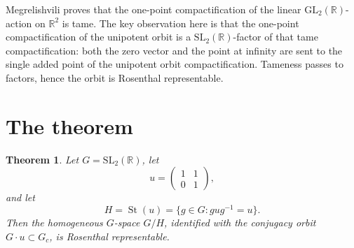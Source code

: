 \documentclass[11pt]{article}
\newtheorem{theorem}{Theorem}
\newcommand{\R}{\mathbb{R}}
\newcommand{\SL}{\mathrm{SL}}
\newcommand{\GL}{\mathrm{GL}}
\newcommand{\St}{\operatorname{St}}
\begin{document}
Megrelishvili proves that the one-point compactification of the linear
\(\GL_2(\R)\)-action on \(\R^2\) is tame.  The key observation here is
that the one-point compactification of the unipotent orbit is a
\(\SL_2(\R)\)-factor of that tame compactification: both the zero vector
and the point at infinity are sent to the single added point of the
unipotent orbit compactification.  Tameness passes to factors, hence
the orbit is Rosenthal representable.

\section*{The theorem}

\begin{theorem}
Let \(G=\SL_2(\R)\), let
\[
u=\begin{pmatrix}1&1\\0&1\end{pmatrix},
\]
and let
\[
H=\St(u)=\{g\in G: gug^{-1}=u\}.
\]
Then the homogeneous \(G\)-space \(G/H\), identified with the conjugacy
orbit \(G\cdot u\subset G_c\), is Rosenthal representable.
\end{theorem}
\end{document}
